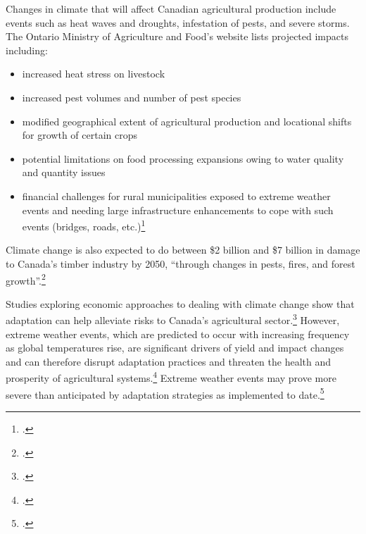 \documentclass[10pt]{article}
\begin{document}
Changes in climate that will affect Canadian agricultural production include events such as heat waves and droughts, infestation of pests, and severe storms.
The Ontario Ministry of Agriculture and Food's website lists projected impacts including:
\begin{itemize}
	\item increased heat stress on livestock
	\item increased pest volumes and number of pest species
	\item modified geographical extent of agricultural production and locational shifts for growth of certain crops
	\item potential limitations on food processing expansions owing to water quality and quantity issues
	\item financial challenges for rural municipalities exposed to extreme weather events and needing large infrastructure enhancements to cope with such events (bridges, roads, etc.)\footcite{OntarioCCandAg}
\end{itemize}
Climate change is also expected to do between \$2 billion and \$7 billion in damage to Canada's timber industry by 2050, ``through changes in pests, fires, and forest growth''.\footcite[][p.16]{NRTEEPrice}



Studies exploring economic approaches to dealing with climate change show that adaptation can help alleviate risks to Canada's agricultural sector.\footcite{Amiraslany2010}
However, extreme weather events, which are predicted to occur with increasing frequency as global temperatures rise, are significant drivers of yield and impact changes and can therefore disrupt adaptation practices and threaten the health and prosperity of agricultural systems.\footcite{IsikDevadoss2006}
Extreme weather events may prove more severe than anticipated by adaptation strategies as implemented to date.\footcite[See for instance:][]{Malcolm2012}
\end{document}
